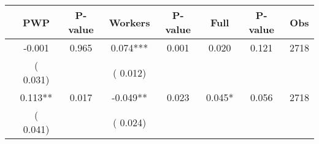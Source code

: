 
\begin{tabular}{l*{7}{c}}\hline&\multicolumn{1}{c}{PWP}&\multicolumn{1}{c}{P-value}&\multicolumn{1}{c}{Workers}&\multicolumn{1}{c}{P-value}&\multicolumn{1}{c}{Full}&\multicolumn{1}{c}{P-value}&\multicolumn{1}{c}{Obs} \\ \hline

        &             -0.001       &        0.965  &              0.074***       &        0.001  &              0.020       &              0.121 &  2718 \\ 
                       &       (       0.031)             &                               &       (       0.012)                     &                               &                                               &                                &                      \\ 

        &              0.113**       &        0.017  &             -0.049**       &        0.023  &              0.045*       &              0.056 &  2718 \\ 
                       &       (       0.041)             &                               &       (       0.024)                     &                               &                                               &                                &                      \\ 

\hline \end{tabular}